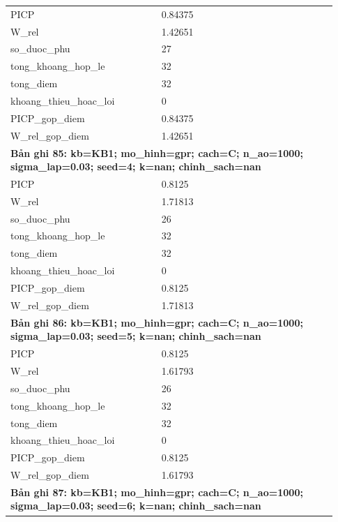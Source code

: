 \begin{longtable}{p{0.43\linewidth}p{0.50\linewidth}}
PICP & 0.84375 \\
W\_\allowbreak rel & 1.42651 \\
so\_\allowbreak duoc\_\allowbreak phu & 27 \\
tong\_\allowbreak khoang\_\allowbreak hop\_\allowbreak le & 32 \\
tong\_\allowbreak diem & 32 \\
khoang\_\allowbreak thieu\_\allowbreak hoac\_\allowbreak loi & 0 \\
PICP\_\allowbreak gop\_\allowbreak diem & 0.84375 \\
W\_\allowbreak rel\_\allowbreak gop\_\allowbreak diem & 1.42651 \\
\midrule
\multicolumn{2}{p{0.95\linewidth}}{\textbf{Bản ghi 85: kb=KB1; mo\_hinh=gpr; cach=C; n\_ao=1000; sigma\_lap=0.03; seed=4; k=nan; chinh\_sach=nan}} \\
PICP & 0.8125 \\
W\_\allowbreak rel & 1.71813 \\
so\_\allowbreak duoc\_\allowbreak phu & 26 \\
tong\_\allowbreak khoang\_\allowbreak hop\_\allowbreak le & 32 \\
tong\_\allowbreak diem & 32 \\
khoang\_\allowbreak thieu\_\allowbreak hoac\_\allowbreak loi & 0 \\
PICP\_\allowbreak gop\_\allowbreak diem & 0.8125 \\
W\_\allowbreak rel\_\allowbreak gop\_\allowbreak diem & 1.71813 \\
\midrule
\multicolumn{2}{p{0.95\linewidth}}{\textbf{Bản ghi 86: kb=KB1; mo\_hinh=gpr; cach=C; n\_ao=1000; sigma\_lap=0.03; seed=5; k=nan; chinh\_sach=nan}} \\
PICP & 0.8125 \\
W\_\allowbreak rel & 1.61793 \\
so\_\allowbreak duoc\_\allowbreak phu & 26 \\
tong\_\allowbreak khoang\_\allowbreak hop\_\allowbreak le & 32 \\
tong\_\allowbreak diem & 32 \\
khoang\_\allowbreak thieu\_\allowbreak hoac\_\allowbreak loi & 0 \\
PICP\_\allowbreak gop\_\allowbreak diem & 0.8125 \\
W\_\allowbreak rel\_\allowbreak gop\_\allowbreak diem & 1.61793 \\
\midrule
\multicolumn{2}{p{0.95\linewidth}}{\textbf{Bản ghi 87: kb=KB1; mo\_hinh=gpr; cach=C; n\_ao=1000; sigma\_lap=0.03; seed=6; k=nan; chinh\_sach=nan}} \\

\end{longtable}
